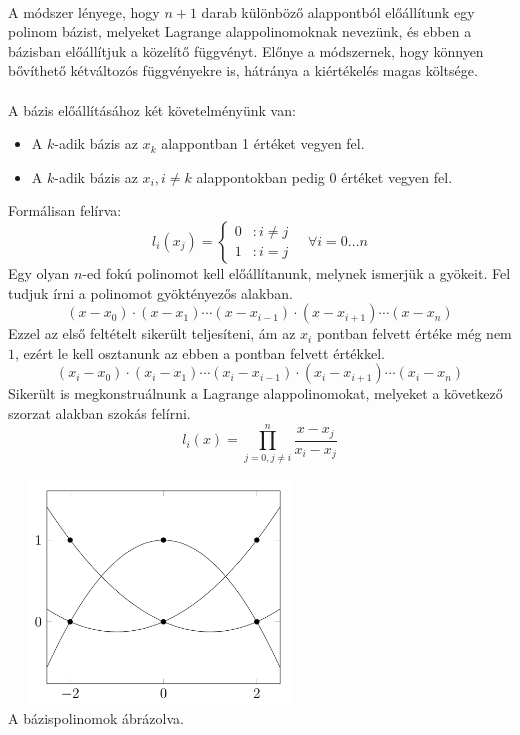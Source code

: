 \documentclass[12pt]{report}
\begin{document}
\paragraph{}
A módszer lényege, hogy $n+1$ darab különböző alappontból előállítunk egy polinom bázist, melyeket Lagrange alappolinomoknak nevezünk, és ebben a bázisban előállítjuk a közelítő függvényt. Előnye a módszernek, hogy könnyen bővíthető kétváltozós függvényekre is, hátránya a kiértékelés magas költsége.
\paragraph{}
A bázis előállításához két követelményünk van:
\begin{itemize}
\item A $k$-adik bázis az $x_k$ alappontban 1 értéket vegyen fel.
\item A $k$-adik bázis az $x_i, i \neq k$ alappontokban pedig 0 értéket vegyen fel.
\end{itemize}
Formálisan felírva:
$$
l_i(x_j) =
\left\{
  \begin{array}{lr}
    0 & : i \neq j\\
    1 & : i = j
  \end{array}
\right.
\quad \forall i = 0 \dots n
$$
Egy olyan $n$-ed fokú polinomot kell előállítanunk, melynek ismerjük a gyökeit. Fel tudjuk írni a polinomot gyöktényezős alakban.
$$
(x-x_0)\cdot(x-x_1)\cdots(x-x_{i-1})\cdot(x-x_{i+1})\cdots(x-x_n)
$$
Ezzel az első feltételt sikerült teljesíteni, ám az $x_i$ pontban felvett értéke még nem $1$, ezért le kell osztanunk az ebben a pontban felvett értékkel.
$$
(x_i-x_0)\cdot(x_i-x_1)\cdots(x_i-x_{i-1})\cdot(x_i-x_{i+1})\cdots(x_i-x_n)
$$
Sikerült is megkonstruálnunk a Lagrange alappolinomokat, melyeket a következő szorzat alakban szokás felírni.
$$
l_i(x) = \prod_{j = 0, j \neq i}^{n} \frac{x-x_j}{x_i-x_j}
$$
\begin{center}
\includegraphics[width=8cm,height=6cm]{pics/lagrange_basis}\\
{\footnotesize A bázispolinomok ábrázolva.}
\end{center}
\end{document}
